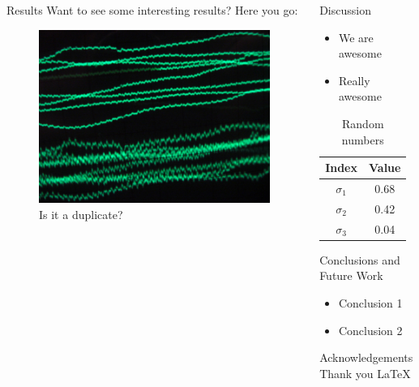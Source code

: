 \documentclass{beamer}
\newlength{\onecolwid}
\begin{document}
\begin{frame}
\begin{columns}[t]
\begin{column}{\onecolwid}
  \begin{block}{Results}
    Want to see some interesting results? Here you go:

    \begin{figure}
      \centering
      \includegraphics[width=0.80\linewidth]{sample}
      \caption{Is it a duplicate?}
      \label{fig:sample2}
    \end{figure}
  \end{block}
\end{column}

\begin{column}{\onecolwid}
  \begin{block}{Discussion}
    \begin{itemize}
      \item We are awesome
      \item Really awesome
    \end{itemize}

    \begin{table}
      \label{tab:random}
      \caption{Random numbers}
      \centering
      \begin{tabular}{c|c}
        Index         & Value \\ \hline
        $\sigma_1$    & 0.68 \\
        $\sigma_2$    & 0.42 \\
        $\sigma_3$    & 0.04
      \end{tabular}
    \end{table}
  \end{block}

  \begin{block}{Conclusions and Future Work}
    \begin{itemize}
      \item Conclusion 1
      \item Conclusion 2
    \end{itemize}
  \end{block}

  \begin{smallblock}{Acknowledgements}
    Thank you \LaTeX
  \end{smallblock}
\end{column}

\end{columns}
\end{frame}
\end{document}
